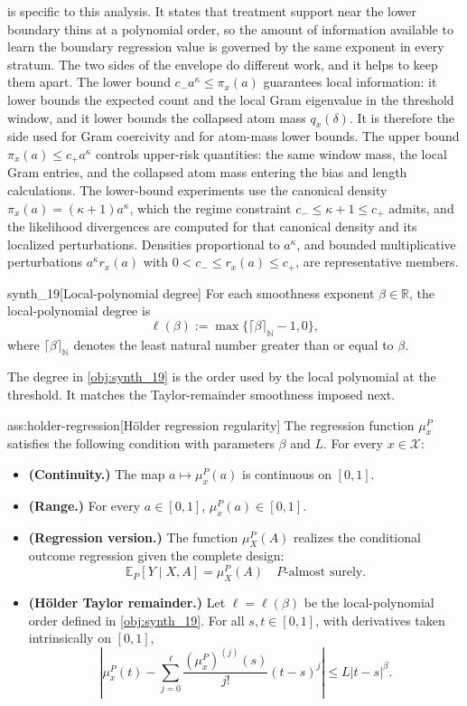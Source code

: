 \documentclass[11pt]{article}
\begin{document}
 is specific to this analysis. It states that treatment support near the lower boundary thins at a polynomial order, so the amount of information available to learn the boundary regression value is governed by the same exponent in every stratum. The two sides of the envelope do different work, and it helps to keep them apart. The lower bound \(c_-a^\kappa\le\pi_x(a)\) guarantees local information: it lower bounds the expected count and the local Gram eigenvalue in the threshold window, and it lower bounds the collapsed atom mass \(q_x(\delta)\). It is therefore the side used for Gram coercivity and for atom-mass lower bounds. The upper bound \(\pi_x(a)\le c_+a^\kappa\) controls upper-risk quantities: the same window mass, the local Gram entries, and the collapsed atom mass entering the bias and length calculations. The lower-bound experiments use the canonical density \(\pi_x(a)=(\kappa+1)a^\kappa\), which the regime constraint \(c_-\le\kappa+1\le c_+\) admits, and the likelihood divergences are computed for that canonical density and its localized perturbations. Densities proportional to \(a^\kappa\), and bounded multiplicative perturbations \(a^\kappa r_x(a)\) with \(0<c_-\le r_x(a)\le c_+\), are representative members.

\begin{definitionv}{synth_19}[Local-polynomial degree]
For each smoothness exponent \(\beta\in\mathbb R\), the local-polynomial degree is
\[
\ell(\beta):=\max\{\lceil\beta\rceil_{\mathbb N}-1,0\},
\]
where \(\lceil\beta\rceil_{\mathbb N}\) denotes the least natural number greater than or equal to \(\beta\).
\end{definitionv}

The degree  in \cref{obj:synth_19} is the order used by the local polynomial at the threshold. It matches the Taylor-remainder smoothness imposed next.

\begin{assumptionv}{ass:holder-regression}[Hölder regression regularity]
The regression function \(\mu_x^P\) satisfies the following condition with parameters \(\beta\) and \(L\). For every \(x\in\mathcal X\):
\begin{itemize}
\item \textbf{(Continuity.)} The map \(a\mapsto \mu_x^P(a)\) is continuous on \([0,1]\).
\item \textbf{(Range.)} For every \(a\in[0,1]\), \(\mu_x^P(a)\in[0,1]\).
\item \textbf{(Regression version.)} The function \(\mu_X^P(A)\) realizes the conditional outcome regression given the complete design:
\[
\mathbb E_P[Y\mid X,A]=\mu_X^P(A)
\quad P\text{-almost surely}.
\]
\item \textbf{(Hölder Taylor remainder.)} Let \(\ell=\ell(\beta)\) be the local-polynomial order defined in \cref{obj:synth_19}. For all \(s,t\in[0,1]\), with derivatives taken intrinsically on \([0,1]\),
\[
\left|
\mu_x^P(t)
-
\sum_{j=0}^{\ell}
\frac{(\mu_x^P)^{(j)}(s)}{j!}(t-s)^j
\right|
\le
L|t-s|^\beta .
\]
\end{itemize}
\end{assumptionv}
\end{document}
